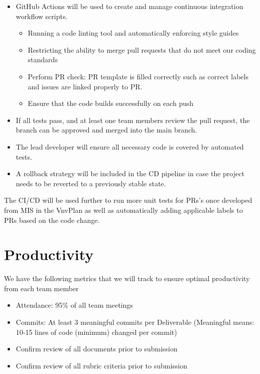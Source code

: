 \documentclass{article}
\begin{document}
\begin{itemize}
	\item GitHub Actions will be used to create and manage continuous integration workflow scripts.
	\begin{itemize}
    \item Running a code linting tool and automatically enforcing style guides
    \item Restricting the ability to merge pull requests that do not meet our coding standards
    \item Perform PR check: PR template is filled correctly such as correct labels and issues are linked properly to PR. 
    \item Ensure that the code builds successfully on each push
  \end{itemize}
	\item If all tests pass, and at least one team members review the pull request, the branch can be approved and merged 
    into the main branch.
	\item The lead developer will ensure all necessary code is covered by automated tests.
	\item A rollback strategy will be included in the CD pipeline in case the project needs 
  to be reverted to a previously stable state.
\end{itemize}

The CI/CD will be used further to run more unit tests for PRs's once developed from MIS in the VnvPlan 
as well as automatically adding applicable labels to PRs based on the code change. 

\section{Productivity}
We have the following metrics that we will track to ensure optimal productivity from each team member

\begin{itemize}
    \item Attendance: 95\% of all team meetings
    \item Commits: At least 3 meaningful commits per Deliverable (Meaningful means: 10-15 lines of code (minimum) changed per commit)
    \item Confirm review of all documents prior to submission
    \item Confirm review of all rubric criteria prior to submission
\end{itemize}
\end{document}
